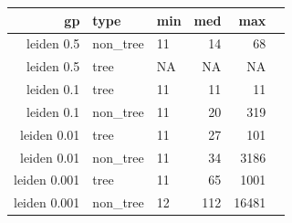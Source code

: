 \documentclass[12pt, oneside]{article}   	%
\begin{document}
\begin{table}[ht]
\centering
\begin{tabular}{rllrrr}
  \hline
 gp & type & min & med & max \\ 
  \hline
leiden 0.5 & non\_tree &  11 & 14 &  68 \\ 
leiden 0.5 & tree &  NA & NA &  NA \\ 
leiden 0.1 & tree &  11 & 11 &  11 \\ 
leiden 0.1 & non\_tree &  11 & 20 & 319 \\ 
leiden 0.01 & tree &  11 & 27 & 101 \\ 
leiden 0.01 & non\_tree &  11 & 34 & 3186 \\ 
leiden 0.001 & tree &  11 & 65 & 1001 \\ 
leiden 0.001 & non\_tree &  12 & 112 & 16481 \\ 

   \hline
\end{tabular}
\end{table}
\end{document}
